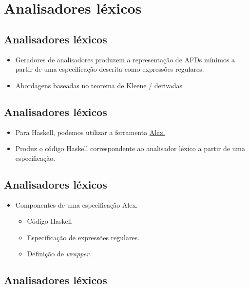 \documentclass[11pt]{article}
\begin{document}
\section*{Analisadores léxicos}
\label{sec:orgb2fb122}

\subsection*{Analisadores léxicos}
\label{sec:org688d9bd}

\begin{itemize}
\item Geradores de analisadores produzem a representação de AFDs mínimos
a partir de uma especificação descrita como expressões regulares.

\item Abordagens baseadas no teorema de Kleene / derivadas
\end{itemize}
\subsection*{Analisadores léxicos}
\label{sec:org494a8d2}

\begin{itemize}
\item Para Haskell, podemos utilizar a ferramenta \href{https://github.com/haskell/alex}{Alex.}

\item Produz o código Haskell correspondente ao analisador léxico a partir de
uma especificação.
\end{itemize}
\subsection*{Analisadores léxicos}
\label{sec:orga787be9}

\begin{itemize}
\item Componentes de uma especificação Alex.
\begin{itemize}
\item Código Haskell
\item Especificação de expressões regulares.
\item Definição de \emph{wrapper}.
\end{itemize}
\end{itemize}
\subsection*{Analisadores léxicos}
\label{sec:orgd91f4fc}
\end{document}
